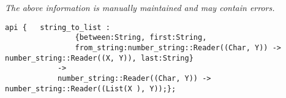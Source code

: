 \label{api:String\_To\_List}

{\tiny \it The above information is manually maintained and may contain errors.}
\begin{verbatim}
api {   string_to_list :
                {between:String, first:String,
                from_string:number_string::Reader((Char, Y)) -> number_string::Reader((X, Y)), last:String}
            ->
            number_string::Reader((Char, Y)) -> number_string::Reader((List(X ), Y));};
\end{verbatim}
